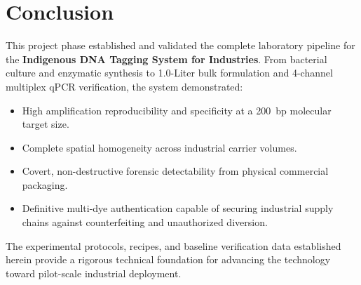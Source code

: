 \section{Conclusion}
This project phase established and validated the complete laboratory pipeline for the \textbf{Indigenous DNA Tagging System for Industries}. From bacterial culture and enzymatic synthesis to 1.0-Liter bulk formulation and 4-channel multiplex qPCR verification, the system demonstrated:
\begin{itemize}
    \item High amplification reproducibility and specificity at a 200~bp molecular target size.
    \item Complete spatial homogeneity across industrial carrier volumes.
    \item Covert, non-destructive forensic detectability from physical commercial packaging.
    \item Definitive multi-dye authentication capable of securing industrial supply chains against counterfeiting and unauthorized diversion.
\end{itemize}
The experimental protocols, recipes, and baseline verification data established herein provide a rigorous technical foundation for advancing the technology toward pilot-scale industrial deployment.

